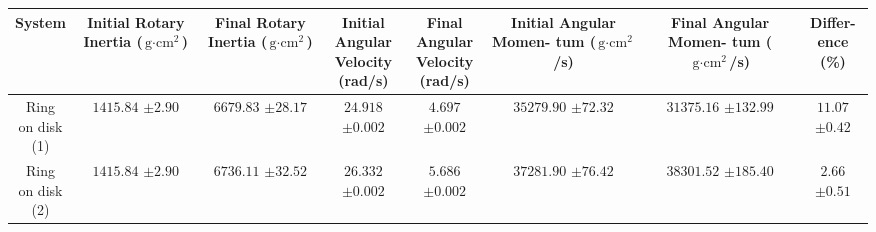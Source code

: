\begin{center}
  \begin{tabular}{|c|c|c|c|c|c|c|c|}
    \hline
    System & \makecell{Initial \\Rotary\\Inertia\\($\text{g$\cdot$cm}^2$)} &     \makecell{Final\\Rotary\\Inertia\\($\text{g$\cdot$cm}^2$)} &    \makecell{Initial\\Angular\\Velocity\\(rad/s)} & \makecell {Final\\Angular\\Velocity\\(rad/s)} & \makecell  {Initial\\Angular\\Momen-\\tum\\($\text{g$\cdot$cm}^2$/s)} & \makecell    {Final\\Angular\\Momen-\\tum\\($\text{g$\cdot$cm}^2$/s)} & \makecell    {Differ-\\ence\\(\%)}\\
    \hline
    \makecell{Ring             \\on disk\\(1)} & \makecell{$1415.84$ \\$\pm2.90$} &    \makecell{$6679.83$\\$\pm28.17$}& \makecell{$24.918$\\$\pm0.002$} &    \makecell{$4.697$\\$\pm0.002$} & \makecell{$35279.90$\\$\pm72.32$} &   \makecell{$31375.16$\\$\pm132.99$} & \makecell{$11.07$\\$\pm0.42$} \\
    \hline
    \makecell{Ring             \\on disk\\(2)} & \makecell{$1415.84$ \\$\pm2.90$} &    \makecell{$6736.11$\\$\pm32.52$}& \makecell{$26.332$\\$\pm0.002$} &    \makecell{$5.686$\\$\pm0.002$} & \makecell{$37281.90$\\$\pm76.42$} &   \makecell{$38301.52$\\$\pm185.40$} & \makecell{$2.66$\\$\pm0.51$} \\

\end{tabular}
\end{center}
